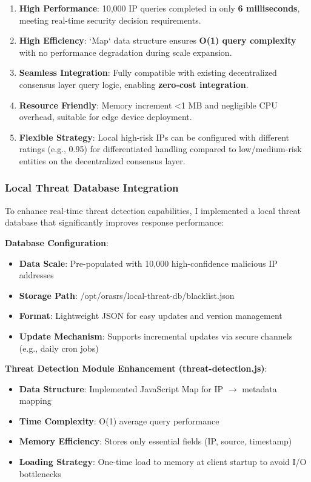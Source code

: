 \documentclass[12pt]{article}
\begin{document}
\begin{enumerate}
\item \textbf{High Performance}: 10,000 IP queries completed in only \textbf{6 milliseconds}, meeting real-time security decision requirements.
\item \textbf{High Efficiency}: `Map` data structure ensures \textbf{O(1) query complexity} with no performance degradation during scale expansion.
\item \textbf{Seamless Integration}: Fully compatible with existing decentralized consensus layer query logic, enabling \textbf{zero-cost integration}.
\item \textbf{Resource Friendly}: Memory increment <1 MB and negligible CPU overhead, suitable for edge device deployment.
\item \textbf{Flexible Strategy}: Local high-risk IPs can be configured with different ratings (e.g., 0.95) for differentiated handling compared to low/medium-risk entities on the decentralized consensus layer.
\end{enumerate}

\subsubsection{Local Threat Database Integration}

To enhance real-time threat detection capabilities, I implemented a local threat database that significantly improves response performance:

\textbf{Database Configuration}:
\begin{itemize}
\item \textbf{Data Scale}: Pre-populated with 10,000 high-confidence malicious IP addresses
\item \textbf{Storage Path}: /opt/orasrs/local-threat-db/blacklist.json
\item \textbf{Format}: Lightweight JSON for easy updates and version management
\item \textbf{Update Mechanism}: Supports incremental updates via secure channels (e.g., daily cron jobs)
\end{itemize}

\textbf{Threat Detection Module Enhancement (threat-detection.js)}:
\begin{itemize}
\item \textbf{Data Structure}: Implemented JavaScript Map for IP $\rightarrow$ metadata mapping
\item \textbf{Time Complexity}: O(1) average query performance
\item \textbf{Memory Efficiency}: Stores only essential fields (IP, source, timestamp)
\item \textbf{Loading Strategy}: One-time load to memory at client startup to avoid I/O bottlenecks
\end{itemize}
\end{document}
